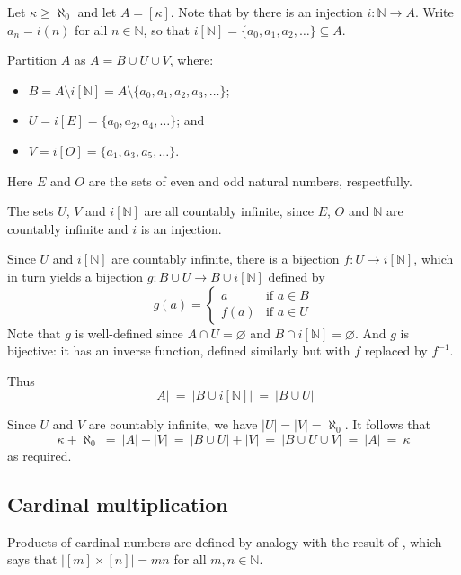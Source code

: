 \begin{cproof}
Let $\kappa \ge \aleph_0$ and let $A = [\kappa]$. Note that by  there is an injection $i : \mathbb{N} \to A$. Write $a_n = i(n)$ for all $n \in \mathbb{N}$, so that $i[\mathbb{N}] = \{ a_0, a_1, a_2, \dots \} \subseteq A$.

Partition $A$ as $A = B \cup U \cup V$, where:
\begin{itemize}
\item $B = A \setminus i[\mathbb{N}] = A \setminus \{ a_0, a_1, a_2, a_3, \dots \}$;
\item $U = i[E] = \{ a_0, a_2, a_4, \dots \}$; and
\item $V = i[O] = \{ a_1, a_3, a_5, \dots \}$.
\end{itemize}
Here $E$ and $O$ are the sets of even and odd natural numbers, respectfully.

The sets $U$, $V$ and $i[\mathbb{N}]$ are all countably infinite, since $E$, $O$ and $\mathbb{N}$ are countably infinite and $i$ is an injection.

Since $U$ and $i[\mathbb{N}]$ are countably infinite, there is a bijection $f : U \to i[\mathbb{N}]$, which in turn yields a bijection $g : B \cup U \to B \cup i[\mathbb{N}]$ defined by
\[ g(a) = \begin{cases} a & \text{if } a \in B \\ f(a) & \text{if } a \in U \end{cases} \]
Note that $g$ is well-defined since $A \cap U = \varnothing$ and $B \cap i[\mathbb{N}] = \varnothing$. And $g$ is bijective: it has an inverse function, defined similarly but with $f$ replaced by $f^{-1}$.

Thus
\[ |A| ~=~ |B \cup i[\mathbb{N}]| ~=~ |B \cup U| \]

Since $U$ and $V$ are countably infinite, we have $|U| = |V| = \aleph_0$. It follows that
\[ \kappa + \aleph_0 ~=~ |A| + |V| ~=~ |B \cup U| + |V| ~=~ |B \cup U \cup V| ~=~ |A| ~=~ \kappa \]
as required.
\end{cproof}

\subsection*{Cardinal multiplication}

Products of cardinal numbers are defined by analogy with the result of , which says that $|[m] \times [n]| = mn$ for all $m,n \in \mathbb{N}$.

